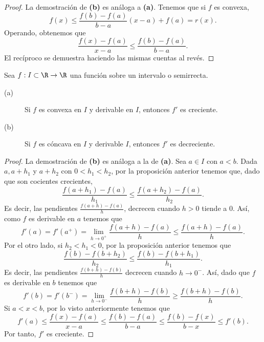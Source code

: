 \begin{proof}
La demostración de \textbf{(b)} es análoga a \textbf{(a)}. Tenemos que si $\displaystyle f $ es convexa, 
\[ f\left(x\right) \leq \frac{f\left(b\right)-f\left(a\right)}{b-a}\left(x-a\right) + f\left(a\right) = r\left(x\right) .\]
Operando, obtenemos que 
\[\frac{f\left(x\right)-f\left(a\right)}{x-a} \leq \frac{f\left(b\right)-f\left(a\right)}{b-a} .\]
El recíproco se demuestra haciendo las mismas cuentas al revés.
\end{proof}
\begin{fprop}[]
\normalfont Sea $\displaystyle f : I \subset \R \to \R $ una función sobre un intervalo o semirrecta.
\begin{description}
\item[(a)] Si $\displaystyle f $ es convexa en $\displaystyle I $ y derivable en $\displaystyle I $, entonces $\displaystyle f' $ es creciente.
\item[(b)] Si $\displaystyle f $ es cóncava en $\displaystyle I $ y derivable $\displaystyle I $, entonces $\displaystyle f' $ es decreciente.
\end{description}
\end{fprop}
\begin{proof}
La demostración de \textbf{(b)} es análoga a la de \textbf{(a)}. Sea $\displaystyle a \in I $ con $\displaystyle a < b $. Dada $\displaystyle a, a + h_{1} $ y $\displaystyle a + h_{2} $ con $\displaystyle 0 < h_{1} < h_{2} $, por la proposición anterior tenemos que, dado que son cocientes crecientes,
\[  \frac{f\left(a + h_{1}\right)-f\left(a\right)}{h_{1}} \leq \frac{f\left(a + h_{2}\right)-f\left(a\right)}{h_{2}} .\]
Es decir, las pendientes $\displaystyle \frac{f\left(a+h\right)-f\left(a\right)}{h} $, decrecen cuando $\displaystyle h > 0 $ tiende a $\displaystyle 0 $. Así, como $\displaystyle f $ es derivable en $\displaystyle a $ tenemos que
\[ f'\left(a\right) = f'\left(a^{+}\right) =\lim_{h \to 0^{+}}\frac{f\left(a+h\right)-f\left(a\right)}{h} \leq \frac{f\left(a+h\right)-f\left(a\right)}{h} .\]
Por el otro lado, si $\displaystyle h_{2} < h_{1} < 0 $, por la proposición anterior tenemos que 
\[ \frac{f\left(b\right)-f\left(b + h_{2}\right)}{h_{2}} \leq \frac{f\left(b\right)-f\left(b+h_{1}\right)}{h_{1}}  .\]
Es decir, las pendientes $\displaystyle \frac{f\left(b+h\right)-f\left(b\right)}{h} $ decrecen cuando $\displaystyle h\to 0^{- } $. Así, dado que $\displaystyle f $ es derivable en $\displaystyle b $ tenemos que
\[ f'\left(b\right) = f'\left(b^{-}\right) = \lim_{h \to 0^{-}}\frac{f\left(b+h\right)-f\left(b\right)}{h} \geq \frac{f\left(b+h\right)-f\left(b\right)}{h} .\]
Si $\displaystyle a < x < b $, por lo visto anteriormente tenemos que
\[ f'\left(a\right) \leq \frac{f\left(x\right)-f\left(a\right)}{x-a} \leq \frac{f\left(b\right)-f\left(a\right)}{b-a} \leq \frac{f\left(b\right)-f\left(x\right)}{b-x} \leq f'\left(b\right) .\]
Por tanto, $\displaystyle f' $ es creciente.
\end{proof}
